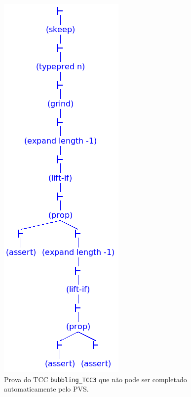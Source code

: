 \begin{figure}[H]
\begin{minipage}{0.45\linewidth}
\end{minipage}
\hfill
\begin{minipage}{0.45\linewidth}
    \centering
    \includegraphics[height=0.4\textheight,width=0.8\linewidth,
    trim={0 0 0 9.7cm},clip]{figures/bubbling-tcc3.png}
\end{minipage}
    \caption{Prova do TCC \texttt{bubbling\_TCC3} que não pode ser completado
    automaticamente pelo PVS.}
    \label{fig:tcc}
\end{figure}

